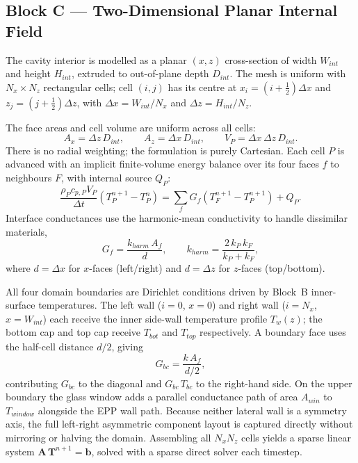 \documentclass[11pt,a4paper]{article}
\begin{document}
\subsection{Block C --- Two-Dimensional Planar Internal Field}
The cavity interior is modelled as a planar $(x,z)$ cross-section of width $W_{int}$
and height $H_{int}$, extruded to out-of-plane depth $D_{int}$. The mesh is uniform
with $N_x \times N_z$ rectangular cells; cell $(i,j)$ has its centre at
$x_i=(i+\tfrac{1}{2})\Delta x$ and $z_j=(j+\tfrac{1}{2})\Delta z$, with
$\Delta x = W_{int}/N_x$ and $\Delta z = H_{int}/N_z$.

The face areas and cell volume are uniform across all cells:
\begin{equation}
A_x = \Delta z\,D_{int},\qquad
A_z = \Delta x\,D_{int},\qquad
V_P = \Delta x\,\Delta z\,D_{int}.
\end{equation}
There is no radial weighting; the formulation is purely Cartesian. Each cell $P$ is
advanced with an implicit finite-volume energy balance over its four faces $f$ to
neighbours $F$, with internal source $Q_P$:
\begin{equation}
\frac{\rho_P c_{p,P} V_P}{\Delta t}\left(T_P^{n+1}-T_P^{n}\right)
= \sum_{f} G_f\left(T_F^{n+1}-T_P^{n+1}\right) + Q_P.
\end{equation}
Interface conductances use the harmonic-mean conductivity to handle dissimilar
materials,
\begin{equation}
G_f = \frac{k_{harm}\,A_f}{d},\qquad
k_{harm} = \frac{2\,k_P\,k_F}{k_P+k_F},
\end{equation}
where $d=\Delta x$ for $x$-faces (left/right) and $d=\Delta z$ for $z$-faces
(top/bottom).

All four domain boundaries are Dirichlet conditions driven by Block~B inner-surface
temperatures. The left wall ($i=0$, $x=0$) and right wall ($i=N_x$, $x=W_{int}$)
each receive the inner side-wall temperature profile $T_w(z)$; the bottom cap and top
cap receive $T_{bot}$ and $T_{top}$ respectively. A boundary face uses the half-cell
distance $d/2$, giving
\begin{equation}
G_{bc} = \frac{k\,A_f}{d/2},
\end{equation}
contributing $G_{bc}$ to the diagonal and $G_{bc}\,T_{bc}$ to the right-hand side. On
the upper boundary the glass window adds a parallel conductance path of area $A_{win}$
to $T_{window}$ alongside the EPP wall path. Because neither lateral wall is a symmetry
axis, the full left-right asymmetric component layout is captured directly without
mirroring or halving the domain. Assembling all $N_x N_z$ cells yields a sparse linear
system $\mathbf{A}\,\mathbf{T}^{n+1}=\mathbf{b}$, solved with a sparse direct solver
each timestep.
\end{document}

